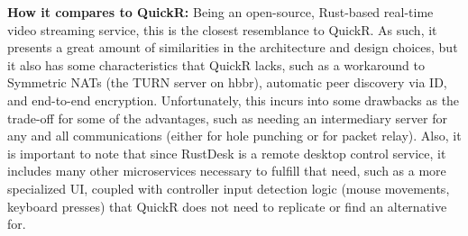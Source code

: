 \documentclass{article}
\begin{document}
    \textbf{How it compares to QuickR:} Being an open-source, Rust-based real-time video streaming service, this is the closest resemblance to QuickR. As such, it presents a great amount of similarities in the architecture and design choices, but it also has some characteristics that QuickR lacks, such as a workaround to
    Symmetric NATs (the TURN server on hbbr), automatic peer discovery via ID, and end-to-end encryption. Unfortunately, this incurs into some drawbacks as the trade-off for some of the advantages, such as needing an intermediary server for any and all communications (either for hole punching or for packet relay).
    Also, it is important to note that since RustDesk is a remote desktop control service, it includes many other microservices necessary to fulfill that need, such as a more specialized UI, coupled with controller input detection logic (mouse movements, keyboard presses) that QuickR does not need to replicate or find an alternative for.   
    
\end{document}
